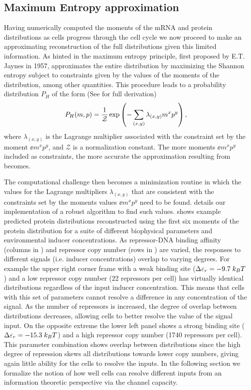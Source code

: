\subsection{Maximum Entropy approximation}\label{sec_maxent}

Having numerically computed the moments of the mRNA and protein distributions as
cells progress through the cell cycle we now proceed to make an approximating
reconstruction of the full distributions given this limited information. As
hinted in  the maximum entropy principle, first proposed by
E.T. Jaynes in 1957, approximates the entire distribution by maximizing the
Shannon entropy subject to constraints given by the values of the moments of the
distribution, among other quantities\cite{Jaynes1957}. This procedure leads to a
probability distribution $P_H$ of the form (See  for full
derivation)
\begin{equation}
  P_H(m, p) = {1 \over \mathcal{Z}}
              \exp \left( - \sum_{(x,y)} \lambda_{(x,y)} m^x p^y \right),
  \label{eq_maxEnt_joint}
\end{equation}
where $\lambda_{(x,y)}$ is the Lagrange multiplier associated with the
constraint set by the moment $\ee{m^x p^y}$, and $\mathcal{Z}$ is a
normalization constant. The more moments $\ee{m^x p^y}$ included as constraints,
the more accurate the approximation resulting from 
becomes.

The computational challenge then becomes a minimization routine in which the
values for the Lagrange multipliers $\lambda_{(x,y)}$ that are consistent with
the constraints set by the moments values $\ee{m^x p^y}$ need to be found.
 details our implementation of a robust algorithm to find
such values.  shows example predicted protein distributions
reconstructed using the first six moments of the protein distribution for a
suite of different biophysical parameters and environmental inducer
concentrations. As repressor-DNA binding affinity (columns in
) and repressor copy number (rows in ) are
varied, the responses to different signals (i.e. inducer concentrations) overlap
to varying degrees. For example the upper right corner frame with a weak binding
site ($\Delta\varepsilon_r = -9.7 \; k_BT$) and a low repressor copy number (22 repressors per
cell) has virtually identical distributions regardless of the input inducer
concentration. This means that cells with this set of parameters cannot resolve
a difference in any concentration of the signal. As the number of repressors is
increased, the degree of overlap between distributions decreases, allowing cells
to better resolve the value of the signal input. On the opposite extreme the
lower left panel shows a strong binding site ($\Delta\varepsilon_r = -15.3 \; k_BT$) and a high
repressor copy number (1740 repressors per cell). This parameter combination
shows overlap between distributions since the high degree of repression skews
all distributions towards lower copy numbers, giving again little ability for
the cells to resolve the inputs. In the following section we formalize the
notion of how well cells can resolve different inputs from an information
theoretic perspective via the channel capacity.

